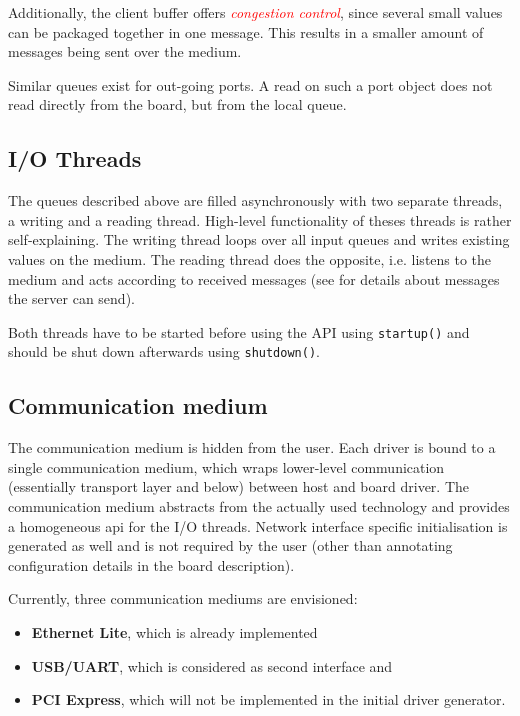 \documentclass{report}
\begin{document}
Additionally, the client buffer offers \textcolor{red}{\textit{congestion control}}, since several small values can be packaged together in one message. This results in a smaller amount of messages being sent over the medium.

Similar queues exist for out-going ports. A read on such a port object does not read directly from the board, but from the local queue.

\subsection{I/O Threads}
The queues described above are filled asynchronously with two separate threads, a writing and a reading thread. High-level functionality of theses threads is rather self-explaining. The writing thread loops over all input queues and writes existing values on the medium. The reading thread does the opposite, i.e. listens to the medium and acts according to received messages (see  for details about messages the server can send).

Both threads have to be started before using the API using \texttt{startup()} and should be shut down afterwards using \texttt{shutdown()}.

\subsection{Communication medium}
The communication medium is hidden from the user. Each driver is bound to a single communication medium, which wraps lower-level communication (essentially transport layer and below) between host and board driver. The communication medium abstracts from the actually used technology and provides a homogeneous api for the I/O threads. Network interface specific initialisation is generated as well and is not required by the user (other than annotating configuration details in the board description).

Currently, three communication mediums are envisioned:
\begin{itemize} \itemsep1pt \parskip0pt 
\item \textbf{Ethernet Lite}, which is already implemented
\item \textbf{USB/UART}, which is considered as second interface and
\item \textbf{PCI Express}, which will not be implemented in the initial driver generator.
\end{itemize}
\end{document}
